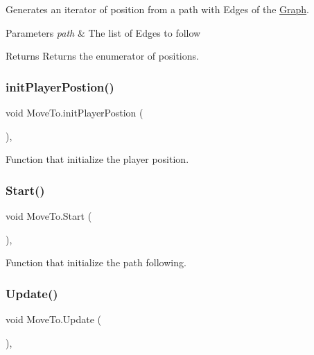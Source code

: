 Generates an iterator of position from a path with Edges of the \hyperlink{classGraph}{Graph}. 


\begin{DoxyParams}{Parameters}
{\em path} & The list of Edges to follow\\
\hline
\end{DoxyParams}
\begin{DoxyReturn}{Returns}
Returns the enumerator of positions.
\end{DoxyReturn}
\mbox{\label{classMoveTo_a83efa78b682117fe0f3308d5b24323c6}} 
\subsubsection{\texorpdfstring{init\+Player\+Postion()}{initPlayerPostion()}}
{\footnotesize\ttfamily void Move\+To.\+init\+Player\+Postion (\begin{DoxyParamCaption}{ }\end{DoxyParamCaption})\hspace{0.3cm}{\ttfamily [inline]}, {\ttfamily [private]}}





Function that initialize the player position. \mbox{\label{classMoveTo_ae802f560d398f92c7cb15ffb306f4202}} 
\subsubsection{\texorpdfstring{Start()}{Start()}}
{\footnotesize\ttfamily void Move\+To.\+Start (\begin{DoxyParamCaption}{ }\end{DoxyParamCaption})\hspace{0.3cm}{\ttfamily [inline]}, {\ttfamily [private]}}



Function that initialize the path following. 

\mbox{\label{classMoveTo_a4d754b4bdb8defeaf68c99a3c6b16e9c}} 
\subsubsection{\texorpdfstring{Update()}{Update()}}
{\footnotesize\ttfamily void Move\+To.\+Update (\begin{DoxyParamCaption}{ }\end{DoxyParamCaption})\hspace{0.3cm}{\ttfamily [inline]}, {\ttfamily [private]}}





